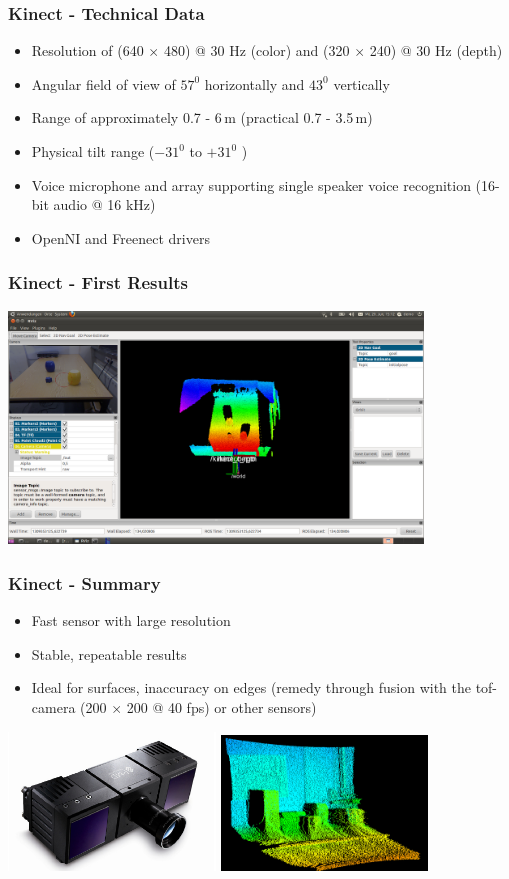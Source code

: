 \begin{frame}
 \frametitle{Kinect - Technical Data}
\begin{itemize}
  \item Resolution of (640 $\times$ 480) @ 30 Hz (color) and (320 $\times$ 240) @ 30 Hz (depth)
  \item Angular field of view of $57^0$ horizontally and $43^0$ vertically
  \item Range of approximately 0.7 - 6\,m (practical 0.7 - 3.5\,m)
  \item Physical tilt range ($-31^0$  to $+31^0$ )
  \item Voice microphone and array supporting single speaker voice recognition (16-bit audio @ 16 kHz)
  \item OpenNI and Freenect drivers
\end{itemize}

\end{frame}


\begin{frame} 
 \frametitle{Kinect - First Results}
\includegraphics[width=11cm]{images/ros_rviz.png}
\end{frame}


\begin{frame}
 \frametitle{Kinect - Summary}
\begin{itemize}
  \item Fast sensor with large resolution
  \item Stable, repeatable results
  \item Ideal for surfaces, inaccuracy on edges (remedy through fusion with the tof-camera (200 $\times$ 200 @ 40 fps) or other sensors)
\end{itemize}
\hspace{3ex}\includegraphics[width=5.5cm]{images/camcube.png}
\includegraphics[width=5.5cm]{images/pmd2.png}
\end{frame}

